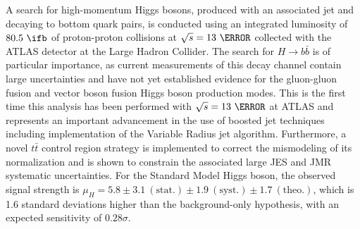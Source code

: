 A search for high-momentum Higgs bosons, produced with an associated jet and
decaying to bottom quark pairs, is conducted using an integrated luminosity of
$80.5~\ifb$ of proton-proton collisions at $\sqrt{s} = 13~\TeV$ collected
with the ATLAS detector at the Large Hadron Collider.  The search for $H
\rightarrow b\bar{b}$ is of particular importance, as current measurements of
this decay channel contain large uncertainties and have not yet established
evidence for the gluon-gluon fusion and vector boson fusion Higgs boson
production modes. This is the first time this analysis has been performed with
$\sqrt{s} = 13~\TeV$ at ATLAS and represents an important advancement in the use
of boosted jet techniques including implementation of the Variable Radius jet
algorithm.  Furthermore, a novel $t\bar{t}$ control region strategy is
implemented to correct the mismodeling of its normalization and is shown to
constrain the associated large JES and JMR systematic uncertainties. For the
Standard Model Higgs boson, the observed signal strength is $\mu_{H} = 5.8 \pm
3.1~\mathrm{(stat.)} \pm 1.9~\mathrm{(syst.)} \pm 1.7~\mathrm{(theo.)}$, which
is 1.6 standard deviations higher than the background-only hypothesis, with an
expected sensitivity of $0.28\sigma.$
